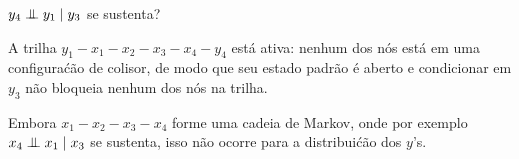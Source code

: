 \begin{exenumerate}
\begin{solution}
    \end{solution}
    
    \item $y_4 \mathrel{\perp\mspace{-10mu}\perp} y_1 \mid y_3$ se sustenta?
    
    \begin{solution}
        A trilha $y_1-x_1-x_2-x_3-x_4-y_4$ est\'a ativa: nenhum dos n\'os
        est\'a em uma configura\'c\~ao de colisor, de modo que seu estado padr\~ao \'e
        aberto e condicionar em $y_3$ n\~ao bloqueia nenhum dos n\'os na
        trilha.
        
        Embora $x_1-x_2-x_3-x_4$ forme uma cadeia de Markov, onde por exemplo $x_4
        \mathrel{\perp\mspace{-10mu}\perp} x_1 \mid x_3$ se sustenta, isso n\~ao ocorre para a distribui\'c\~ao
        dos $y$'s.
        
    \end{solution}
\end{exenumerate}



